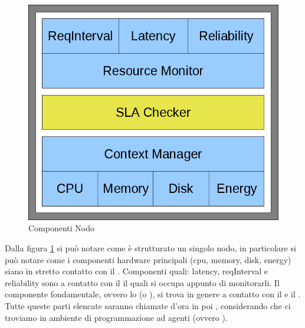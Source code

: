 \begin{figure}[H]
\begin{center}
\includegraphics[scale=0.5]{etc/nodo.png}
\caption{Componenti Nodo}
\label{componentinodo}
\end{center}
\end{figure}
Dalla figura \ref{componentinodo} si può notare come è strutturato un singolo nodo, in particolare si può notare come i componenti hardware principali (cpu, memory, disk, energy) siano in stretto contatto con il . Componenti quali: latency, reqInterval e reliability sono a contatto con il  il quali si occupa appunto di monitorarli. Il componente fondamentale, ovvero lo  (o ), si trova in genere a contatto con il  e il . Tutte queste parti elencate saranno chiamate d'ora in poi , considerando che ci troviamo in ambiente di programmazione ad agenti (ovvero ).
